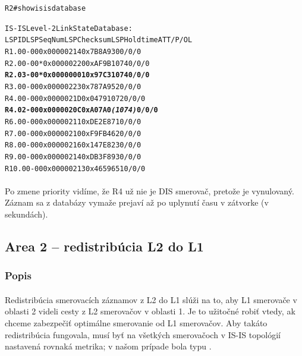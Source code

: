 \documentclass[12pt,twoside,a4paper]{report}
\begin{document}
\noindent
{\selectfont
\begin{small}
\begin{alltt}

R2#show isis database 

IS-IS Level-2 Link State Database:
LSPID                 LSP Seq Num  LSP Checksum  LSP Holdtime      ATT/P/OL
R1.00-00              0x00000214   0x7B8A        930               0/0/0
R2.00-00            * 0x00000220   0xAF9B        1074              0/0/0
\textbf{R2.03-00            * 0x00000001   0x97C3        1074              0/0/0}
R3.00-00              0x00000223   0x787A        952               0/0/0
R4.00-00              0x0000021D   0x0479        1072              0/0/0
\textbf{R4.02-00              0x0000020C   0xA07A        0 \textit{(1074)}          0/0/0}
R6.00-00              0x00000211   0xDE2E        871               0/0/0
R7.00-00              0x00000210   0xF9FB        462               0/0/0
R8.00-00              0x00000216   0x147E        823               0/0/0
R9.00-00              0x00000214   0xDB3F        893               0/0/0
R10.00-00             0x00000213   0x4659        651               0/0/0

\end{alltt}
\end{small}
}

\paragraph{}
Po zmene priority vidíme, že R4 už nie je DIS smerovač, pretože  je vynulovaný. Záznam sa z databázy vymaže prejaví až po uplynutí času v zátvorke (v sekundách).







\subsection{Area 2 – redistribúcia L2 do L1}
\subsubsection{Popis}
\paragraph{}
Redistribúcia smerovacích záznamov z L2 do L1 slúži na to, aby L1 smerovače v oblasti 2 videli cesty z L2 smerovačov v oblasti 1. Je to užitočné  robiť vtedy, ak chceme zabezpečiť optimálne smerovanie od L1 smerovačov. Aby takáto redistribúcia fungovala, musí byť na všetkých smerovačoch v IS-IS topológií nastavená rovnaká metrika; v našom prípade bola typu .
\end{document}
